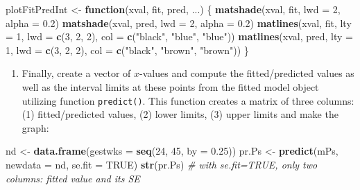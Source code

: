 \documentclass[
]{book}
\newenvironment{Shaded}{\begin{snugshade}}{\end{snugshade}}
\newcommand{\AttributeTok}[1]{\textcolor[rgb]{0.13,0.29,0.53}{#1}}
\newcommand{\CommentTok}[1]{\textcolor[rgb]{0.56,0.35,0.01}{\textit{#1}}}
\newcommand{\ConstantTok}[1]{\textcolor[rgb]{0.56,0.35,0.01}{#1}}
\newcommand{\ControlFlowTok}[1]{\textcolor[rgb]{0.13,0.29,0.53}{\textbf{#1}}}
\newcommand{\DecValTok}[1]{\textcolor[rgb]{0.00,0.00,0.81}{#1}}
\newcommand{\FloatTok}[1]{\textcolor[rgb]{0.00,0.00,0.81}{#1}}
\newcommand{\FunctionTok}[1]{\textcolor[rgb]{0.13,0.29,0.53}{\textbf{#1}}}
\newcommand{\NormalTok}[1]{#1}
\newcommand{\OtherTok}[1]{\textcolor[rgb]{0.56,0.35,0.01}{#1}}
\newcommand{\StringTok}[1]{\textcolor[rgb]{0.31,0.60,0.02}{#1}}
\providecommand{\tightlist}{%
  \setlength{\itemsep}{0pt}\setlength{\parskip}{0pt}}
\begin{document}
\begin{Shaded}
\begin{Highlighting}[]
\NormalTok{plotFitPredInt }\OtherTok{\textless{}{-}} \ControlFlowTok{function}\NormalTok{(xval, fit, pred, ...) \{}
  \FunctionTok{matshade}\NormalTok{(xval, fit, }\AttributeTok{lwd =} \DecValTok{2}\NormalTok{, }\AttributeTok{alpha =} \FloatTok{0.2}\NormalTok{)}
  \FunctionTok{matshade}\NormalTok{(xval, pred, }\AttributeTok{lwd =} \DecValTok{2}\NormalTok{, }\AttributeTok{alpha =} \FloatTok{0.2}\NormalTok{)}
  \FunctionTok{matlines}\NormalTok{(xval, fit, }\AttributeTok{lty =} \DecValTok{1}\NormalTok{, }\AttributeTok{lwd =} \FunctionTok{c}\NormalTok{(}\DecValTok{3}\NormalTok{, }\DecValTok{2}\NormalTok{, }\DecValTok{2}\NormalTok{), }\AttributeTok{col =} \FunctionTok{c}\NormalTok{(}\StringTok{"black"}\NormalTok{, }\StringTok{"blue"}\NormalTok{, }\StringTok{"blue"}\NormalTok{))}
  \FunctionTok{matlines}\NormalTok{(xval, pred, }\AttributeTok{lty =} \DecValTok{1}\NormalTok{, }\AttributeTok{lwd =} \FunctionTok{c}\NormalTok{(}\DecValTok{3}\NormalTok{, }\DecValTok{2}\NormalTok{, }\DecValTok{2}\NormalTok{), }\AttributeTok{col =} \FunctionTok{c}\NormalTok{(}\StringTok{"black"}\NormalTok{, }\StringTok{"brown"}\NormalTok{, }\StringTok{"brown"}\NormalTok{))}
\NormalTok{\}}
\end{Highlighting}
\end{Shaded}

\begin{enumerate}
\def\labelenumi{\arabic{enumi}.}
\setcounter{enumi}{2}
\tightlist
\item
  Finally, create a vector of \(x\)-values and compute
  the fitted/predicted values as well
  as the interval limits at these points from the fitted
  model object utilizing
  function \texttt{predict()}.
  This function creates a matrix of three columns: (1) fitted/predicted
  values, (2) lower limits, (3) upper limits and
  make the graph:
\end{enumerate}

\begin{Shaded}
\begin{Highlighting}[]
\NormalTok{nd }\OtherTok{\textless{}{-}} \FunctionTok{data.frame}\NormalTok{(}\AttributeTok{gestwks =} \FunctionTok{seq}\NormalTok{(}\DecValTok{24}\NormalTok{, }\DecValTok{45}\NormalTok{, }\AttributeTok{by =} \FloatTok{0.25}\NormalTok{))}
\NormalTok{pr.Ps }\OtherTok{\textless{}{-}} \FunctionTok{predict}\NormalTok{(mPs, }\AttributeTok{newdata =}\NormalTok{ nd, }\AttributeTok{se.fit =} \ConstantTok{TRUE}\NormalTok{)}
\FunctionTok{str}\NormalTok{(pr.Ps) }\CommentTok{\# with se.fit=TRUE, only two columns: fitted value and its SE}
\end{Highlighting}
\end{Shaded}
\end{document}
